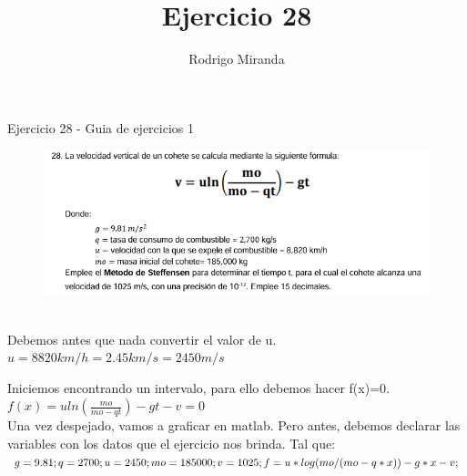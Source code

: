 \documentclass{article}
\title{Ejercicio 28}
\author{Rodrigo Miranda}
\theoremstyle{mytheoremstyle}
\theoremstyle{mytheoremstyle}
\theoremstyle{myproblemstyle}
\begin{document}
    \maketitle Ejercicio 28 - Guia de ejercicios 1
    \begin{figure}[ht]
        \includegraphics[scale=0.9]{img/stf28_1.png}
    \end{figure}
    \\Debemos antes que nada convertir el valor de u. $u=8820 km/h = 2.45km/s= 2450m/s$
    
    Iniciemos encontrando un intervalo, para ello debemos hacer f(x)=0.
    \\$ f(x)=uln(\frac{mo}{mo-qt})-gt-v=0$
    \\Una vez despejado, vamos a graficar en matlab. Pero antes, debemos declarar las variables con los datos que el ejercicio nos brinda.
    Tal que:
    $
    g=9.81;\\
    q=2700;\\
    u=2450;\\
    mo=185000;\\
    v=1025;\\
    f=u*log(mo/(mo-q*x))-g*x-v;
    $
    
\end{document}
